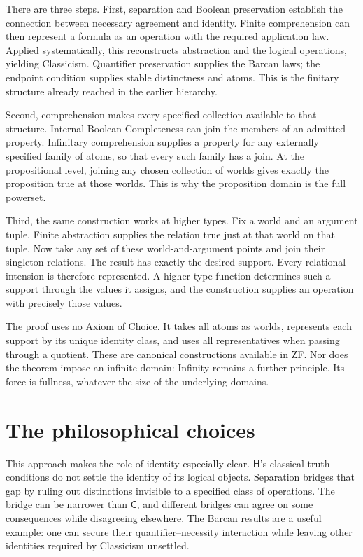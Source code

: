 \documentclass[12pt,letterpaper]{article}
\newcommand{\Hlogic}{\mathsf{H}}
\newcommand{\C}{\mathsf{C}}
\begin{document}
There are three steps. First, separation and Boolean preservation establish the connection between necessary agreement and identity. Finite comprehension can then represent a formula as an operation with the required application law. Applied systematically, this reconstructs abstraction and the logical operations, yielding Classicism. Quantifier preservation supplies the Barcan laws; the endpoint condition supplies stable distinctness and atoms. This is the finitary structure already reached in the earlier hierarchy.


Second, comprehension makes every specified collection available to that structure. Internal Boolean Completeness can join the members of an admitted property. Infinitary comprehension supplies a property for any externally specified family of atoms, so that every such family has a join. At the propositional level, joining any chosen collection of worlds gives exactly the proposition true at those worlds. This is why the proposition domain is the full powerset.


Third, the same construction works at higher types. Fix a world and an argument tuple. Finite abstraction supplies the relation true just at that world on that tuple. Now take any set of these world-and-argument points and join their singleton relations. The result has exactly the desired support. Every relational intension is therefore represented. A higher-type function determines such a support through the values it assigns, and the construction supplies an operation with precisely those values.


The proof uses no Axiom of Choice. It takes all atoms as worlds, represents each support by its unique identity class, and uses all representatives when passing through a quotient. These are canonical constructions available in ZF. Nor does the theorem impose an infinite domain: Infinity remains a further principle. Its force is fullness, whatever the size of the underlying domains.


\section{The philosophical choices}

This approach makes the role of identity especially clear. $\Hlogic$'s classical truth conditions do not settle the identity of its logical objects. Separation bridges that gap by ruling out distinctions invisible to a specified class of operations. The bridge can be narrower than $\C$, and different bridges can agree on some consequences while disagreeing elsewhere. The Barcan results are a useful example: one can secure their quantifier--necessity interaction while leaving other identities required by Classicism unsettled.
\end{document}
